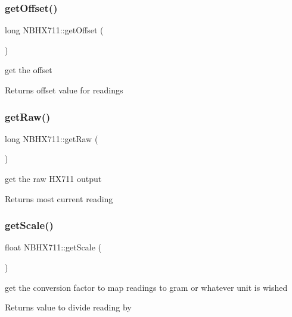 \subsubsection{\texorpdfstring{get\+Offset()}{getOffset()}}
{\footnotesize\ttfamily long N\+B\+H\+X711\+::get\+Offset (\begin{DoxyParamCaption}{ }\end{DoxyParamCaption})}

get the offset \begin{DoxyReturn}{Returns}
offset value for readings 
\end{DoxyReturn}
\mbox{\label{class_n_b_h_x711_a4df2657394217ebe09eafb1b843124ed}} 
\subsubsection{\texorpdfstring{get\+Raw()}{getRaw()}}
{\footnotesize\ttfamily long N\+B\+H\+X711\+::get\+Raw (\begin{DoxyParamCaption}{ }\end{DoxyParamCaption})}

get the raw H\+X711 output \begin{DoxyReturn}{Returns}
most current reading 
\end{DoxyReturn}
\mbox{\label{class_n_b_h_x711_a078dafd360269e0505239ba465cc6920}} 
\subsubsection{\texorpdfstring{get\+Scale()}{getScale()}}
{\footnotesize\ttfamily float N\+B\+H\+X711\+::get\+Scale (\begin{DoxyParamCaption}{ }\end{DoxyParamCaption})}

get the conversion factor to map readings to gram or whatever unit is wished \begin{DoxyReturn}{Returns}
value to divide reading by 
\end{DoxyReturn}
\mbox{\label{class_n_b_h_x711_a48ff4a2c0b428911a850f6c2bea833f3}} 
